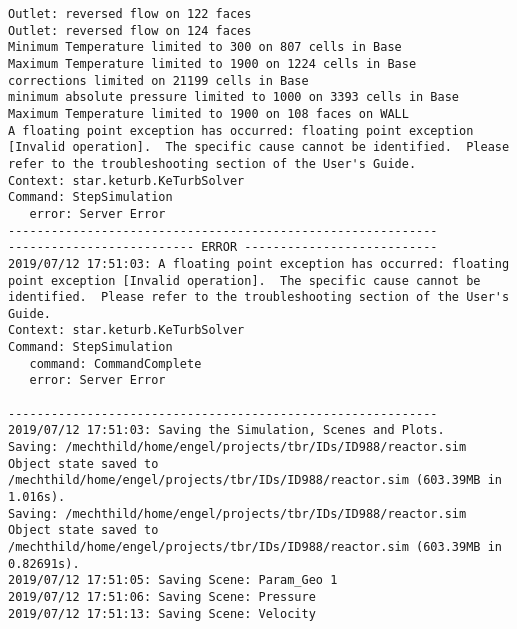 \documentclass{article}
\begin{document}
{\begin{verbatim}
Outlet: reversed flow on 122 faces 
Outlet: reversed flow on 124 faces 
Minimum Temperature limited to 300 on 807 cells in Base
Maximum Temperature limited to 1900 on 1224 cells in Base
corrections limited on 21199 cells in Base
minimum absolute pressure limited to 1000 on 3393 cells in Base
Maximum Temperature limited to 1900 on 108 faces on WALL
A floating point exception has occurred: floating point exception [Invalid operation].  The specific cause cannot be identified.  Please refer to the troubleshooting section of the User's Guide.
Context: star.keturb.KeTurbSolver
Command: StepSimulation
   error: Server Error
------------------------------------------------------------
-------------------------- ERROR ---------------------------
2019/07/12 17:51:03: A floating point exception has occurred: floating point exception [Invalid operation].  The specific cause cannot be identified.  Please refer to the troubleshooting section of the User's Guide.
Context: star.keturb.KeTurbSolver
Command: StepSimulation
   command: CommandComplete
   error: Server Error

------------------------------------------------------------
2019/07/12 17:51:03: Saving the Simulation, Scenes and Plots.
Saving: /mechthild/home/engel/projects/tbr/IDs/ID988/reactor.sim
Object state saved to /mechthild/home/engel/projects/tbr/IDs/ID988/reactor.sim (603.39MB in 1.016s).
Saving: /mechthild/home/engel/projects/tbr/IDs/ID988/reactor.sim
Object state saved to /mechthild/home/engel/projects/tbr/IDs/ID988/reactor.sim (603.39MB in 0.82691s).
2019/07/12 17:51:05: Saving Scene: Param_Geo 1
2019/07/12 17:51:06: Saving Scene: Pressure
2019/07/12 17:51:13: Saving Scene: Velocity
\end{verbatim}
}
\clearpage
\end{document}
